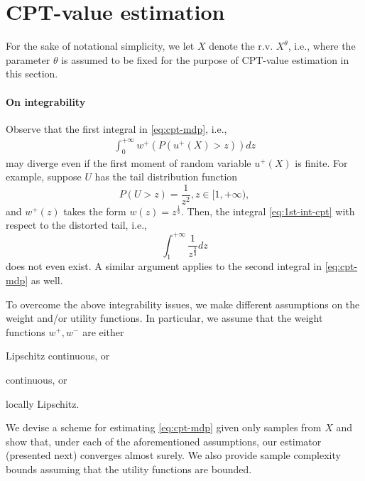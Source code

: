 \documentclass[11pt,letterpaper,english]{article}
\begin{document}
\section{CPT-value estimation} 
\label{sec:cpt-sampling}

For the sake of notational simplicity, we let $X$ denote the r.v. $X^\theta$, i.e., where the parameter $\theta$ is assumed to be fixed for the purpose of CPT-value estimation in this section. 

\paragraph{On integrability}
Observe that the first integral in \eqref{eq:cpt-mdp}, i.e., 
\begin{align}
\label{eq:1st-int-cpt}
\int_0^{+\infty} w^+(P(u^+(X)>z)) d z
\end{align}
may diverge even if the first moment of random variable $u^+(X)$ is finite. 
For example, suppose $U$ has the tail distribution function
$$P(U>z)  = \frac{1}{z^2}, z\in [1, +\infty),$$
and $w^+(z)$ takes the form $w(z) = z^{\frac{1}{3}}$. Then, the integral \eqref{eq:1st-int-cpt} with respect to the distorted tail, i.e.,
$$
\int_1^{+\infty} \frac{1}{z^{\frac{2}{3}}} dz
$$
does not even exist. A similar argument applies to the second integral in \eqref{eq:cpt-mdp} as well.

To overcome the above integrability issues, we make different assumptions on the weight and/or utility functions. In particular, we assume that the weight functions $w^+, w^-$ are either 
\begin{inparaenum}[\bfseries (i)]
\item Lipschitz continuous, or
\item \holder continuous, or
\item locally Lipschitz.
\end{inparaenum}
We devise a scheme for estimating \eqref{eq:cpt-mdp} given only samples from $X$ and show that, under each of the aforementioned assumptions, our estimator (presented next) converges almost surely. 
We also provide sample complexity bounds assuming that the utility functions are bounded.
\end{document}
